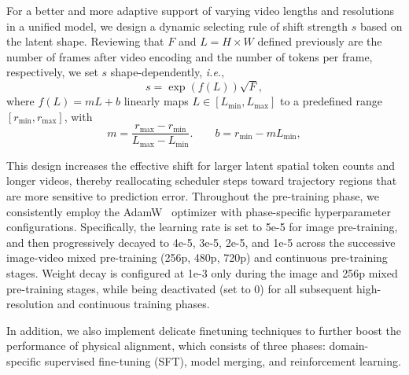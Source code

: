 For a better and more adaptive support of varying video lengths and resolutions in a unified model, we design a dynamic selecting rule of shift strength $s$ based on the latent shape. Reviewing that $F$ and $L=H\times W$ defined previously are the number of frames after video encoding and the number of tokens per frame, respectively, we set $s$ shape-dependently, \textit{i.e.},
\begin{equation}
    s = \exp(f(L))\sqrt{F},
\end{equation}
where $f(L) = mL + b$ linearly maps $L \in [L_{\min}, L_{\max}]$ to a predefined range $[r_{\min}, r_{\max}]$, with
\begin{equation}
m = \frac{r_{\max}-r_{\min}}{L_{\max}-L_{\min}}.
\qquad
b = r_{\min} - mL_{\min},
\label{eq:kairos_mu_coeffs}
\end{equation}


This design increases the effective shift for larger latent spatial token counts and longer videos, thereby reallocating scheduler steps toward trajectory regions that are more sensitive to prediction error. Throughout the pre-training phase, we consistently employ the AdamW~\citep{loshchilov2019decoupledweightdecayregularization} optimizer with phase-specific hyperparameter configurations. Specifically, the learning rate is set to 5e-5 for image pre-training, and then progressively decayed to 4e-5, 3e-5, 2e-5, and 1e-5 across the successive image-video mixed pre-training (256p, 480p, 720p) and continuous pre-training stages. Weight decay is configured at 1e-3 only during the image and 256p mixed pre-training stages, while being deactivated (set to 0) for all subsequent high-resolution and continuous training phases.


In addition, we also implement delicate finetuning techniques to further boost the performance of physical alignment, which consists of three phases: domain-specific supervised fine-tuning (SFT), model merging, and reinforcement learning.

